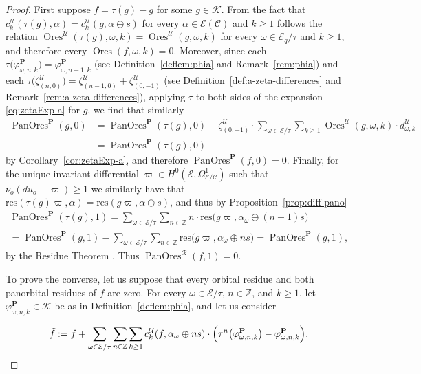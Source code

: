 \documentclass[preprint,12pt]{elsarticle}
\numberwithin{equation}{section} %
\theoremstyle{theorem}
\theoremstyle{definition}
\newcommand{\Ca}{\mathcal{C}} %
\newcommand{\bk}{\mathcal{K}} %
\newcommand{\ec}{\mathcal{E}} %
\newcommand{\idec}{{o}} %
\newcommand{\ecq}{\ec_{q}}
\newcommand{\orbitq}{{\ecq/\tau}} %
\newcommand{\orbita}{{\ec/\tau}} %
\newcommand{\Z}{\mathbb{Z}} %
\newcommand{\za}[2]{\zeta^{\mathcal{U}}_{( {#1} , {#2} )}}
\DeclareMathOperator{\ores}{Ores}
\DeclareMathOperator{\pano}{PanOres}
\begin{document}
\begin{proof}
   First suppose $f=\tau(g)-g$ for some $g\in\bk$. From the fact that $c_k^\mathcal{U}(\tau(g),\alpha)=c_k^\mathcal{U}(g,\alpha\oplus s)$ for every $\alpha\in\ec(\Ca)$ and $k\geq 1$ follows the relation $\ores^\mathcal{U}(\tau(g),\omega,k)=\ores^\mathcal{U}(g,\omega,k)$ for every $\omega\in\orbitq$ and $k\geq 1$, and therefore every $\ores(f,\omega,k)=0$. Moreover, since each $\tau\bigl(\varphi^\mathbf{P}_{\omega,n,k}\bigr)=\varphi^\mathbf{P}_{\omega,n-1,k}$ (see Definition~\ref{deflem:phia} and Remark~\ref{rem:phia}) and each $\tau\bigl(\za{n}{0}\bigr)=\za{n-1}{0}+\za{0}{-1}$ (see Definition~\ref{def:a-zeta-differences} and Remark~\ref{rem:a-zeta-differences}), applying $\tau$ to both sides of the expansion \eqref{eq:zetaExp-a} for $g$, we find that similarly
   \begin{align*}
       \pano^\mathbf{P}(g,0)&=\pano^\mathbf{P}(\tau(g),0)-\za{0}{-1}\cdot\sum_{\omega\in\orbita}\sum_{k\geq 1}\ores^\mathcal{U}(g,\omega,k)\cdot d^\mathcal{U}_{\omega,k}\\&=\pano^\mathbf{P}(\tau(g),0)
   \end{align*}
   by Corollary~\ref{cor:zetaExp-a}, and therefore $\pano^\mathbf{P}(f,0)=0$. Finally, for the unique invariant differential $\varpi\in H^0(\ec,\Omega^1_{\ec/\Ca})$ such that $\nu_\idec(du_\idec-\varpi)\geq 1$ we similarly have that $\mathrm{res}(\tau(g)\varpi,\alpha)=\mathrm{res}(g\varpi,\alpha\oplus s)$, and thus by Proposition~\ref{prop:diff-pano} \begin{multline*}\pano^\mathbf{P}(\tau(g),1) =\sum_{\omega\in\orbita}\sum_{n\in \Z}n\cdot\mathrm{res}\bigl(g\varpi,\alpha_\omega\oplus (n+1)s\bigr)\\
    =\pano^\mathbf{P}(g,1)-\sum_{\omega\in\orbita}\sum_{n\in\Z}\mathrm{res}\bigl(g\varpi,\alpha_\omega\oplus ns\bigr)=\pano^\mathbf{P}(g,1),\end{multline*} by the Residue Theorem \cite[Thm.~III.7.14.2]{Hartshorne}. Thus $\pano^\mathcal{R}(f,1)=0$. 

    To prove the converse, let us suppose that every orbital residue and both panorbital residues of $f$ are zero. For every $\omega\in\orbita$, $n\in\Z$, and $k\geq 1$, let $\varphi^{\mathbf{P}}_{\omega,n,k}\in\bk$ be as in Definition~\ref{deflem:phia}, and let us consider

    \begin{equation}\label{eq:ftildea-def}\tilde{f}:=f+\sum_{\omega\in\orbita}\sum_{n\in\Z}\sum_{k\geq 1}c_k^{\mathcal{U}}(f,\alpha_{\omega}\oplus ns)\cdot\Bigl(\tau^n\bigl(\varphi^\mathbf{P}_{\omega,n,k}\bigr)-\varphi^\mathbf{P}_{\omega,n,k}\Bigr).\end{equation}


\end{proof}
\end{document}
